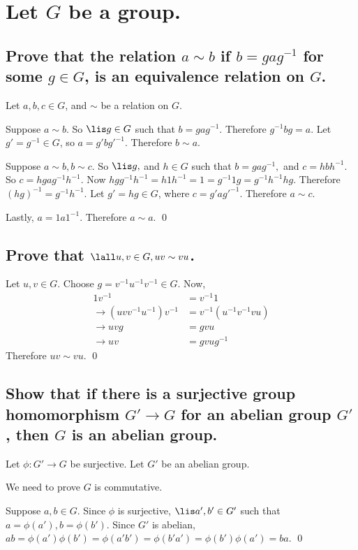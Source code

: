\section[Problem 1]{Let $G$ be a group.}
    \subsection[(i)]{Prove that the relation $a \sim b$ if $b = gag^{-1}$ for some
        $g\in G$, is an equivalence relation on $G$.}
        Let $a,b,c \in G$, and $\sim$ be a relation on $G$.

        Suppose $a \sim b$.
        So $\lis g \in G$ such that $b = gag^{-1}$.
        Therefore $g^{-1}b g = a$.
        Let $g' = g^{-1} \in G$,
        so $a = g' b g'^{-1}$.
        Therefore $b \sim a$.

        Suppose $a \sim b, b \sim c$.
        So $\lis g,$ and $h \in G$ such that $b = gag^{-1},$ and $c = hbh^{-1}$.
        So $c = hgag^{-1}h^{-1}$.
        Now $hg g^{-1}h^{-1} = h1h^{-1} = 1 = g^{-1}1g = g^{-1}h^{-1}hg$.
        Therefore $(hg)^{-1} = g^{-1}h^{-1}$.
        Let $g' = hg \in G$, where $c = g' a g'^{-1}$.
        Therefore $a \sim c$.

        Lastly, $a = 1 a 1^{-1}$.
        Therefore $a \sim a$.
        \qed


    \subsection[(ii)]{Prove that $\lall u,v \in G, uv \sim vu$.}
        Let $u,v \in G$.
        Choose $g = v^{-1}u^{-1}v^{-1} \in G$.
        Now, 
        \begin{align*}
            1 v^{-1} &= v^{-1} 1 \\
            \to (uv v^{-1}u^{-1})v^{-1} &= v^{-1}(u^{-1}v^{-1}vu) \\
            \to uvg &= gvu \\
            \to uv &= gvug^{-1}
        \end{align*}
        Therefore $uv \sim vu$.
        \qed


    \subsection[(iii)]{Show that if there is a surjective group homomorphism $G'\to G$ for an 
        abelian group $G'$, then $G$ is an abelian group.}
        Let $\phi: G' \to G$ be surjective. Let $G'$ be an abelian group.

        We need to prove $G$ is commutative.

        Suppose $a,b \in G$. 
        Since $\phi$ is surjective, $\lis a',b' \in G'$ such that $a = \phi(a'), b = \phi(b')$.
        Since $G'$ is abelian, $ab = \phi(a')\phi(b') = \phi(a'b') = \phi(b'a') = \phi(b')\phi(a')= ba$.
        \qed